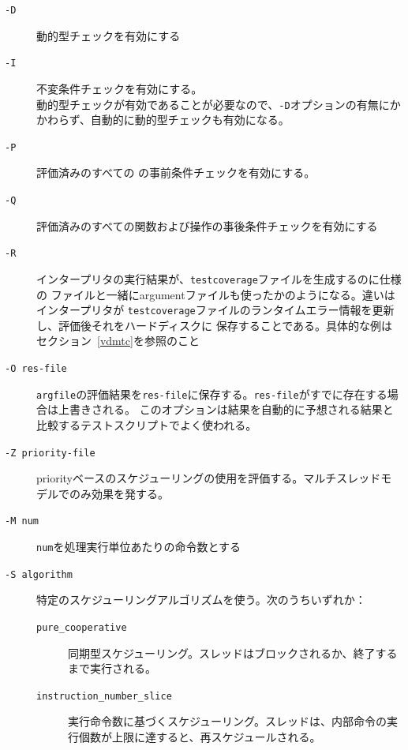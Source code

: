 \documentclass[\pformat,12pt]{jarticle}
\begin{document}
\begin{description}


\item[{\tt -D}] 動的型チェックを有効にする
  
\item[{\tt -I}] 不変条件チェックを有効にする。 \\
  動的型チェックが有効であることが必要なので、{\tt -D}オプションの有無にかかわらず、自動的に動的型チェックも有効になる。\\

\item[{\tt -P}]
評価済みのすべての
の事前条件チェックを有効にする。

\item[{\tt -Q}]
評価済みのすべての関数および操作の事後条件チェックを有効にする

\item[{\tt -R}]
  インタープリタの実行結果が、{\tt testcoverage}ファイルを生成するのに仕様の
  ファイルと一緒にargumentファイルも使ったかのようになる。違いはインタープリタが
  {\tt testcoverage}ファイルのランタイムエラー情報を更新し、評価後それをハードディスクに
  保存することである。具体的な例はセクション~\ref{vdmtc}を参照のこと
  
\item[{\tt -O res-file}]
  {\tt argfile}の評価結果を{\tt res-file}に保存する。{\tt res-file}がすでに存在する場合は上書きされる。
  このオプションは結果を自動的に予想される結果と比較するテストスクリプトでよく使われる。
  
\item[{\tt -Z priority-file}]
  priorityベースのスケジューリングの使用を評価する。マルチスレッドモデルでのみ効果を発する。
\item[{\tt -M num}] {\tt num}を処理実行単位あたりの命令数とする

\item[{\tt -S algorithm}]
  特定のスケジューリングアルゴリズムを使う。次のうちいずれか：
  \begin{description}
  \item[{\tt pure\_cooperative}] 同期型スケジューリング。スレッドはブロックされるか、終了するまで実行される。
  \item[{\tt instruction\_number\_slice}] 実行命令数に基づくスケジューリング。スレッドは、内部命令の実行個数が上限に達すると、再スケジュールされる。
  \end{description}


\end{description}
\end{document}
